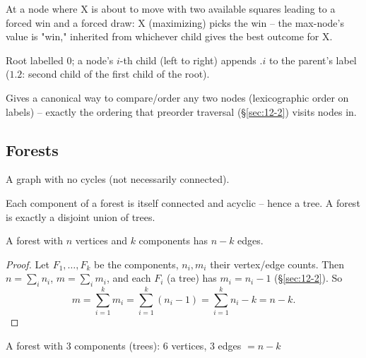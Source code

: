 \documentclass[11pt]{article}
\begin{document}
\begin{example}
At a node where X is about to move with two available squares leading to a forced win and a forced draw: X (maximizing) picks the win -- the max-node's value is "win," inherited from whichever child gives the best outcome for X.
\end{example}

\begin{definition}
Root labelled $0$; a node's $i$-th child (left to right) appends $.i$ to the parent's label ($1.2$: second child of the first child of the root).
\end{definition}

\begin{note}
Gives a canonical way to compare/order any two nodes (lexicographic order on labels) -- exactly the ordering that preorder traversal (\S\ref{sec:12-2}) visits nodes in.
\end{note}

\subsection{Forests}
\label{sec:12-3}

\begin{definition}[Forest]
A graph with no cycles (not necessarily connected).
\end{definition}

\begin{note}
Each component of a forest is itself connected and acyclic -- hence a tree. A forest is exactly a disjoint union of trees.
\end{note}

\begin{theorem}[CN Thm 69]
A forest with $n$ vertices and $k$ components has $n-k$ edges.
\end{theorem}
\begin{proof}
Let $F_1,\dots,F_k$ be the components, $n_i,m_i$ their vertex/edge counts. Then $n=\sum_i n_i$, $m=\sum_i m_i$, and each $F_i$ (a tree) has $m_i=n_i-1$ (\S\ref{sec:12-2}). So
\[
m = \sum_{i=1}^k m_i = \sum_{i=1}^k (n_i-1) = \sum_{i=1}^k n_i - k = n-k.
\]
\end{proof}

\begin{center}
\end{center}
\begin{center}
\small A forest with $3$ components (trees): $6$ vertices, $3$ edges $=n-k$
\end{center}
\end{document}
